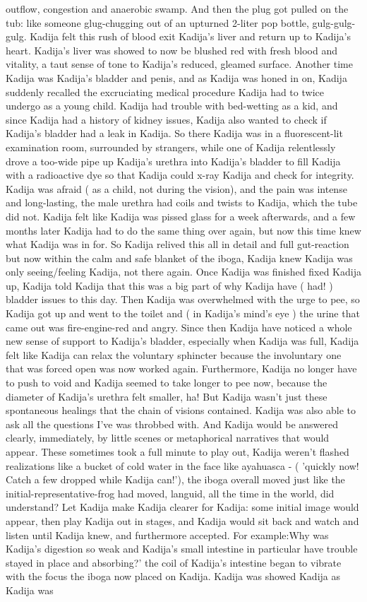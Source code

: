 \documentclass[12pt]{book}
\begin{document}
outflow, congestion and anaerobic swamp. And then the plug got pulled on the tub: like someone glug-chugging out of an upturned 2-liter pop bottle, gulg-gulg-gulg. Kadija felt this rush of blood exit Kadija's liver and return up to Kadija's heart. Kadija's liver was showed to now be blushed red with fresh blood and vitality, a taut sense of tone to Kadija's reduced, gleamed surface. Another time Kadija was Kadija's bladder and penis, and as Kadija was honed in on, Kadija suddenly recalled the excruciating medical procedure Kadija had to twice undergo as a young child. Kadija had trouble with bed-wetting as a kid, and since Kadija had a history of kidney issues, Kadija also wanted to check if Kadija's bladder had a leak in Kadija. So there Kadija was in a fluorescent-lit examination room, surrounded by strangers, while one of Kadija relentlessly drove a too-wide pipe up Kadija's urethra into Kadija's bladder to fill Kadija with a radioactive dye so that Kadija could x-ray Kadija and check for integrity. Kadija was afraid ( as a child, not during the vision), and the pain was intense and long-lasting, the male urethra had coils and twists to Kadija, which the tube did not. Kadija felt like Kadija was pissed glass for a week afterwards, and a few months later Kadija had to do the same thing over again, but now this time knew what Kadija was in for. So Kadija relived this all in detail and full gut-reaction but now within the calm and safe blanket of the iboga, Kadija knew Kadija was only seeing/feeling Kadija, not there again. Once Kadija was finished fixed Kadija up, Kadija told Kadija that this was a big part of why Kadija have ( had! ) bladder issues to this day. Then Kadija was overwhelmed with the urge to pee, so Kadija got up and went to the toilet and ( in Kadija's mind's eye ) the urine that came out was fire-engine-red and angry. Since then Kadija have noticed a whole new sense of support to Kadija's bladder, especially when Kadija was full, Kadija felt like Kadija can relax the voluntary sphincter because the involuntary one that was forced open was now worked again. Furthermore, Kadija no longer have to push to void and Kadija seemed to take longer to pee now, because the diameter of Kadija's urethra felt smaller, ha! But Kadija wasn't just these spontaneous healings that the chain of visions contained. Kadija was also able to ask all the questions I've was throbbed with. And Kadija would be answered clearly, immediately, by little scenes or metaphorical narratives that would appear. These sometimes took a full minute to play out, Kadija weren't flashed realizations like a bucket of cold water in the face like ayahuasca - ( 'quickly now! Catch a few dropped while Kadija can!'), the iboga overall moved just like the initial-representative-frog had moved, languid, all the time in the world, did understand? Let Kadija make Kadija clearer for Kadija: some initial image would appear, then play Kadija out in stages, and Kadija would sit back and watch and listen until Kadija knew, and furthermore accepted. For example:Why was Kadija's digestion so weak and Kadija's small intestine in particular have trouble stayed in place and absorbing?' the coil of Kadija's intestine began to vibrate with the focus the iboga now placed on Kadija. Kadija was showed Kadija as Kadija was 
\end{document}
